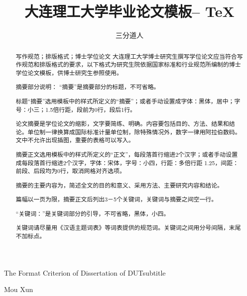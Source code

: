 \documentclass[doctor]{dutthesis} %
\begin{document}

\title{大连理工大学毕业论文模板-- \TeX}{}{The Format Criterion of Dissertation of 
DUT}{subtitle}
%

\author{三分道人}{Mou Xun}

\address{物理系}
\maketitle

\begin{abstract}{写作规范；排版格式；博士学位论文 }
大连理工大学博士研究生撰写学位论文应当符合写作规范和排版格式的要求，以下格式为研究生院依据国家标准和行业规范所编制的博士学位论文模板，供博士研究生参照使用。 

摘要部分说明：
“摘要”是摘要部分的标题，不可省略。

标题“摘要”选用模板中的样式所定义的“摘要”；或者手动设置成字体：黑体，居中；字号：小三；1.5倍行距，段前为0行，段后1行。

论文摘要是学位论文的缩影，文字要简练、明确。内容要包括目的、方法、结果和结论。单位制一律换算成国际标准计量单位制，除特殊情况外，数字一律用阿拉伯数码。文中不允许出现插图，重要的表格可以写入。

摘要正文选用模板中的样式所定义的“正文”，每段落首行缩进2个汉字；或者手动设置成每段落首行缩进2个汉字，字体：宋体，字号：小四，行距：多倍行距 1.25，间距：前段、后段均为0行，取消网格对齐选项。

摘要的主要内容为，简述全文的目的和意义、采用方法、主要研究内容和结论。

篇幅以一页为限，摘要正文后列出3－5个关键词，关键词与摘要之间空一行。

“关键词：”是关键词部分的引导，不可省略，黑体，小四。

关键词请尽量用《汉语主题词表》等词表提供的规范词。关键词之间用分号间隔，末尾不加标点。

\end{abstract}
\end{document}
